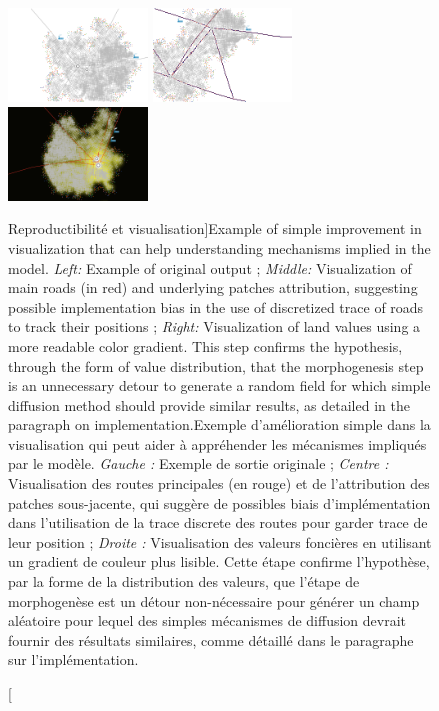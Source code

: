 \begin{figure}
\centering
\hspace{-2cm}
\includegraphics[width=0.33\textwidth]{Figures/Methodology/Reproducibility/stdView}
\hfill
\includegraphics[width=0.33\textwidth]{Figures/Methodology/Reproducibility/ViewRoads}
\hfill
\includegraphics[width=0.33\textwidth]{Figures/Methodology/Reproducibility/landValues_cityFinished}
\caption[Reproducibility and visualization][Reproductibilité et visualisation]{Example of simple improvement in visualization that can help understanding mechanisms implied in the model. \textit{Left: } Example of original output ; \textit{Middle: } Visualization of main roads (in red) and underlying patches attribution, suggesting possible implementation bias in the use of discretized trace of roads to track their positions ; \textit{Right: }Visualization of land values using a more readable color gradient. This step confirms the hypothesis, through the form of value distribution, that the morphogenesis step is an unnecessary detour to generate a random field for which simple diffusion method should provide similar results, as detailed in the paragraph on implementation.}{Exemple d'amélioration simple dans la visualisation qui peut aider à appréhender les mécanismes impliqués par le modèle. \textit{Gauche : } Exemple de sortie originale ; \textit{Centre : } Visualisation des routes principales (en rouge) et de l'attribution des patches sous-jacente, qui suggère de possibles biais d'implémentation dans l'utilisation de la trace discrete des routes pour garder trace de leur position ; \textit{Droite : } Visualisation des valeurs foncières en utilisant un gradient de couleur plus lisible. Cette étape confirme l'hypothèse, par la forme de la distribution des valeurs, que l'étape de morphogenèse est un détour non-nécessaire pour générer un champ aléatoire pour lequel des simples mécanismes de diffusion devrait fournir des résultats similaires, comme détaillé dans le paragraphe sur l'implémentation.}
\label{fig:example_tij_viz}
\end{figure}



